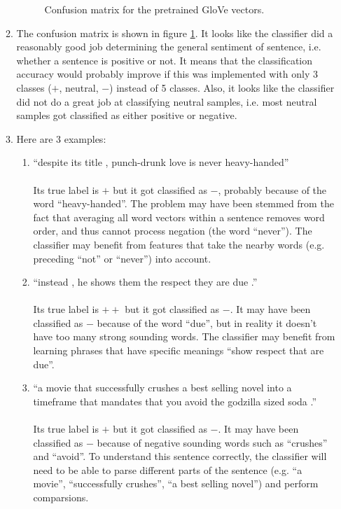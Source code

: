 \documentclass[10pt,reqno]{amsart}
\begin{document}
\begin{enumerate}[topsep=0pt,itemsep=3ex,partopsep=1ex,parsep=1ex]
\begin{enumerate}[itemsep=2ex]
\begin{figure}[h!]
      \caption{Confusion matrix for the pretrained GloVe vectors.}
      \label{fig3}
    \end{figure}
  \item The confusion matrix is shown in figure \ref{fig3}. 
    It looks like the classifier did a reasonably good job determining the 
    general sentiment of sentence, i.e. whether a sentence is positive or not. 
    It means that the classification accuracy would probably improve if this was 
    implemented with only 3 classes ($+$, neutral, $-$) instead of 5 classes. 
    Also, it looks like the classifier did not do a great job at classifying neutral samples, 
    i.e. most neutral samples got classified as either positive or negative. 
  \item
    Here are 3 examples:
    \begin{enumerate}
      \item ``despite its title , punch-drunk love is never heavy-handed''\\
        \\
        Its true label is $+$ but it got classified as $-$, probably because of the word ``heavy-handed''. 
        The problem may have been stemmed from the fact that averaging all word vectors within a sentence 
        removes word order, and thus cannot process negation (the word ``never''). The classifier may 
        benefit from features that take the nearby words (e.g. preceding ``not'' or ``never'') into account. 

      \item ``instead , he shows them the respect they are due .''\\
        \\
        Its true label is $++$ but it got classified as $-$. It may have been classified as $-$ because of the word ``due'', 
        but in reality it doesn't have too many strong sounding words. The classifier may benefit from learning phrases that
        have specific meanings ``show respect that are due''. 

      \item ``a movie that successfully crushes a best selling novel into a timeframe that mandates that you avoid the godzilla sized soda .''\\
        \\
        Its true label is $+$ but it got classified as $-$. It may have been classified as $-$ because of negative sounding words 
        such as ``crushes'' and ``avoid''. To understand this sentence correctly, the classifier will need to be able to parse 
        different parts of the sentence (e.g. ``a movie'', ``successfully crushes'', ``a best selling novel'') and perform
        comparsions. 
       
    \end{enumerate}

  \end{enumerate}

\end{enumerate}
\end{document}
